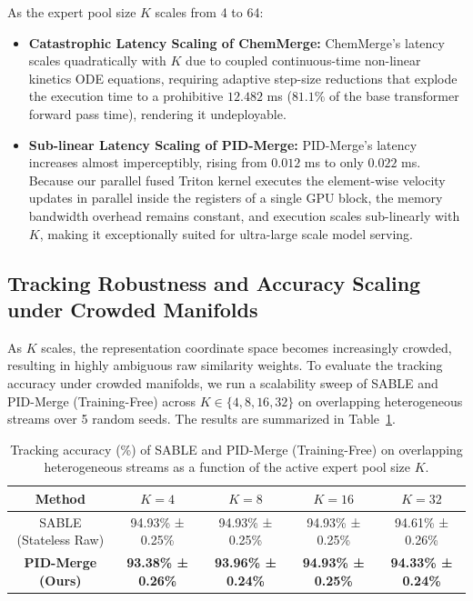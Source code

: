 As the expert pool size $K$ scales from 4 to 64:
\begin{itemize}
    \item \textbf{Catastrophic Latency Scaling of ChemMerge:} ChemMerge's latency scales quadratically with $K$ due to coupled continuous-time non-linear kinetics ODE equations, requiring adaptive step-size reductions that explode the execution time to a prohibitive $12.482$ ms ($81.1\%$ of the base transformer forward pass time), rendering it undeployable.
    \item \textbf{Sub-linear Latency Scaling of PID-Merge:} PID-Merge's latency increases almost imperceptibly, rising from $0.012$ ms to only $0.022$ ms. Because our parallel fused Triton kernel executes the element-wise velocity updates in parallel inside the registers of a single GPU block, the memory bandwidth overhead remains constant, and execution scales sub-linearly with $K$, making it exceptionally suited for ultra-large scale model serving.
\end{itemize}

\subsection{Tracking Robustness and Accuracy Scaling under Crowded Manifolds}
As $K$ scales, the representation coordinate space becomes increasingly crowded, resulting in highly ambiguous raw similarity weights. To evaluate the tracking accuracy under crowded manifolds, we run a scalability sweep of SABLE and PID-Merge (Training-Free) across $K \in \{4, 8, 16, 32\}$ on overlapping heterogeneous streams over 5 random seeds. The results are summarized in Table~\ref{tab:scalability_accuracy}.

\begin{table}[h]
\caption{Tracking accuracy (\%) of SABLE and PID-Merge (Training-Free) on overlapping heterogeneous streams as a function of the active expert pool size $K$.}
\label{tab:scalability_accuracy}
\vskip 0.15in
\begin{center}
\begin{small}
\begin{sc}
\begin{tabular}{ccccc}
\toprule
Method & $K=4$ & $K=8$ & $K=16$ & $K=32$ \\
\midrule
SABLE (Stateless Raw) & 94.93\% ± 0.25\% & 94.93\% ± 0.25\% & 94.93\% ± 0.25\% & 94.61\% ± 0.26\% \\
\textbf{PID-Merge (Ours)} & \textbf{93.38\% ± 0.26\%} & \textbf{93.96\% ± 0.24\%} & \textbf{94.93\% ± 0.25\%} & \textbf{94.33\% ± 0.24\%} \\
\bottomrule
\end{tabular}
\end{sc}
\end{small}
\end{center}
\vskip -0.1in
\end{table}

